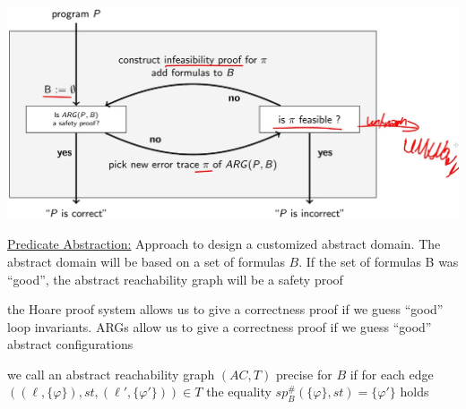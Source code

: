 \documentclass[a4paper]{article}
\begin{document}
\begin{minipage}[t]{0.16\linewidth}
\begin{betterlist}
{{\begin{betterlist}
					\includegraphics[width=\linewidth]{./figures/cegar_approach.png}
					\item \underline{Predicate Abstraction:} Approach to design a customized abstract domain. The abstract domain will be based on a set of formulas $B$. If the set of formulas B was \enquote{good}, the abstract reachability graph will be a safety proof
					\begin{betterlist}
						\item the Hoare proof system allows us to give a correctness proof if we guess \enquote{good} loop invariants. ARGs allow us to give a correctness proof if we guess “good” abstract configurations
						\item we call an abstract reachability graph $(AC, T)$ \alert{precise for $B$} if for each edge $((\ell, \{\varphi\}), st, (\ell', \{\varphi'\})) \in T$ the equality $sp^\#_B(\{\varphi\}, st) = \{\varphi'\}$ holds
					\end{betterlist}


\end{betterlist}}}
\end{betterlist}
\end{minipage}
\end{document}
